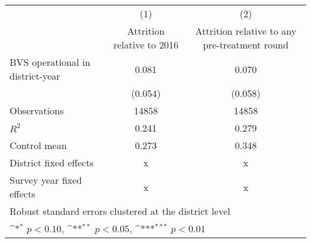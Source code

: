 {
\def\sym#1{\ifmmode^{#1}\else\(^{#1}\)\fi}
\begin{tabular}{l*{2}{c}}
\toprule
                    &\multicolumn{1}{c}{(1)}&\multicolumn{1}{c}{(2)}\\
                    &\multicolumn{1}{c}{Attrition relative to 2016}&\multicolumn{1}{c}{Attrition relative to any pre-treatment round}\\
\midrule
BVS operational in district-year&       0.081         &       0.070         \\
                    &     (0.054)         &     (0.058)         \\
\midrule
Observations        &       14858         &       14858         \\
\(R^{2}\)           &       0.241         &       0.279         \\
Control mean        &       0.273         &       0.348         \\
District fixed effects&           x         &           x         \\
Survey year fixed effects&           x         &           x         \\
\bottomrule
\multicolumn{3}{l}{\footnotesize Robust standard errors clustered at the district level}\\
\multicolumn{3}{l}{\footnotesize \sym{*} \(p<0.10\), \sym{**} \(p<0.05\), \sym{***} \(p<0.01\)}\\
\end{tabular}
}
